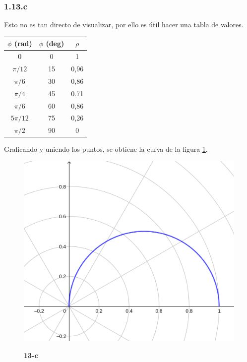 \documentclass{article}
\begin{document}
\subsubsection*{1.13.c}
\label{subsubsec:1.13.c}

Esto no es tan directo de visualizar, por ello es útil hacer una tabla de valores.

\begin{center}
\begin{tabular}{ |c|c|c| }
 \hline
 $\phi$ (rad) & $\phi$ (deg) & $\rho$ \\ [0.5ex] 
 \hline\hline
 \hline
 0 & 0 & 1 \\ 
 $\pi/12$ & 15 & 0,96 \\ 
 $\pi/6$ & 30 & 0,86 \\
 $\pi/4$ & 45 & 0.71 \\
 $\pi/6$ & 60 & 0,86 \\
 $5\pi/12$ & 75 & 0,26 \\
 $\pi/2$ & 90 & 0 \\
 \hline
\end{tabular}
\end{center}

Graficando y uniendo los puntos, se obtiene la curva de la figura \ref{fig:1-13-c}.

\begin{figure}[ht]
\caption{\textbf{13-c}}
\includegraphics[scale=4.5]{img/ejercicios/1/13-c.png} 
\centering
\label{fig:1-13-c}
\end{figure}
\end{document}
